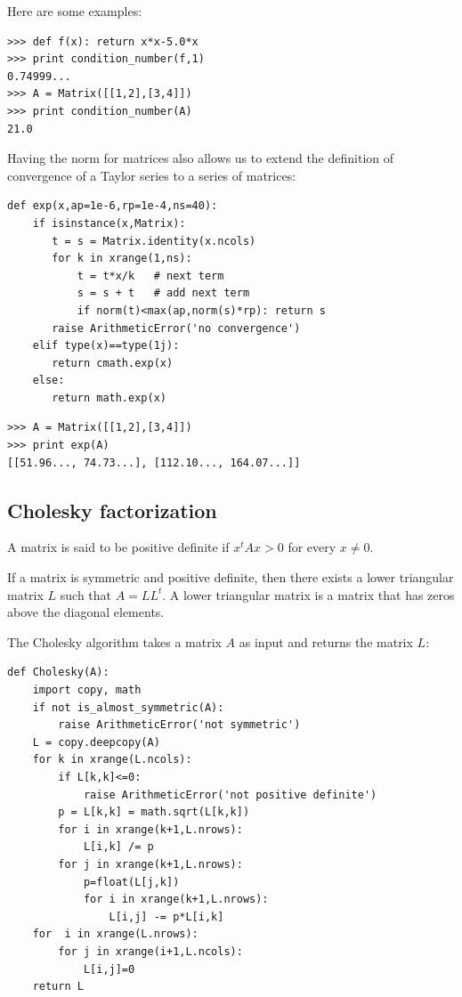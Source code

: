 \documentclass[justified,sixbynine]{tufte-book}
\def\ft{\small\tt}
\theoremstyle{plain}%
\theoremstyle{definition}
\theoremstyle{remark}
\begin{document}
\begin{fullwidth}
Here are some examples:

\begin{lstlisting}[caption={in file: {\ft nlib.py}}]
>>> def f(x): return x*x-5.0*x
>>> print condition_number(f,1)
0.74999...
>>> A = Matrix([[1,2],[3,4]])
>>> print condition_number(A)
21.0
\end{lstlisting}


Having the norm for matrices also allows us to extend the definition of convergence of a Taylor series to a series of matrices:

\begin{lstlisting}[caption={in file: {\ft nlib.py}}]
def exp(x,ap=1e-6,rp=1e-4,ns=40):
    if isinstance(x,Matrix):
       t = s = Matrix.identity(x.ncols)
       for k in xrange(1,ns):
           t = t*x/k   # next term
           s = s + t   # add next term
           if norm(t)<max(ap,norm(s)*rp): return s
       raise ArithmeticError('no convergence')
    elif type(x)==type(1j):
       return cmath.exp(x)
    else:
       return math.exp(x)
\end{lstlisting}

\begin{lstlisting}[caption={in file: {\ft nlib.py}}]
>>> A = Matrix([[1,2],[3,4]])
>>> print exp(A)
[[51.96..., 74.73...], [112.10..., 164.07...]]
\end{lstlisting}

\goodbreak\subsection{Cholesky factorization}


A matrix is said to be positive definite if $x^t Ax>0$ for every $x\neq0$.

If a matrix is symmetric and positive definite, then there exists a lower triangular matrix $L$ such that $A=L L^t$. A lower triangular matrix is a matrix that has zeros above the diagonal elements.

The Cholesky algorithm takes a matrix $A$ as input and returns the matrix $L$:

\begin{lstlisting}[caption={in file: {\ft nlib.py}}]
def Cholesky(A):
    import copy, math
    if not is_almost_symmetric(A):
        raise ArithmeticError('not symmetric')
    L = copy.deepcopy(A)
    for k in xrange(L.ncols):
        if L[k,k]<=0:
            raise ArithmeticError('not positive definite')
        p = L[k,k] = math.sqrt(L[k,k])
        for i in xrange(k+1,L.nrows):
            L[i,k] /= p
        for j in xrange(k+1,L.nrows):
            p=float(L[j,k])
            for i in xrange(k+1,L.nrows):
                L[i,j] -= p*L[i,k]
    for  i in xrange(L.nrows):
        for j in xrange(i+1,L.ncols):
            L[i,j]=0
    return L
\end{lstlisting}


\end{fullwidth}
\end{document}
